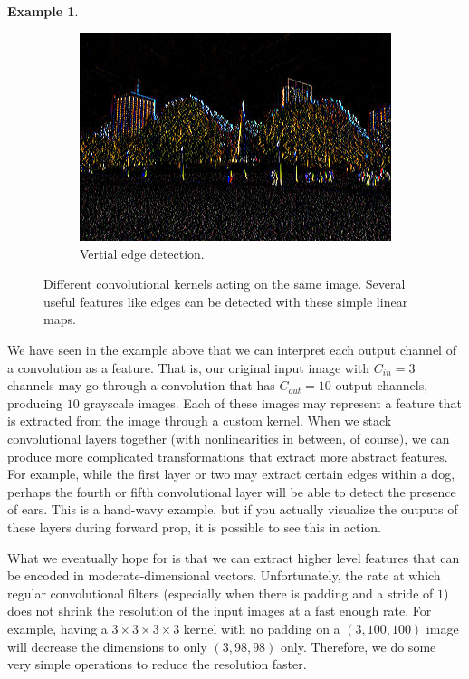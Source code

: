 \documentclass{article}
\theoremstyle{definition}
\newtheorem{example}{Example}[section]
\theoremstyle{remark}
\theoremstyle{definition}
\begin{document}
\begin{example}
\begin{figure}[hbt!]
\begin{subfigure}[b]{0.32\textwidth}
            \includegraphics[width=\textwidth]{Images/OpenCV/Vertical.png}
            \caption{Vertial edge detection. }
            \label{fig:vertical_edge}
        \end{subfigure} 

        \caption{Different convolutional kernels acting on the same image. Several useful features like edges can be detected with these simple linear maps. }
        \label{fig:feature_extraction}
    \end{figure}
    \end{example}

    We have seen in the example above that we can interpret each output channel of a convolution as a feature. That is, our original input image with $C_{in} = 3$ channels may go through a convolution that has $C_{out} = 10$ output channels, producing $10$ grayscale images. Each of these images may represent a feature that is extracted from the image through a custom kernel. When we stack convolutional layers together (with nonlinearities in between, of course), we can produce more complicated transformations that extract more abstract features. For example, while the first layer or two may extract certain edges within a dog, perhaps the fourth or fifth convolutional layer will be able to detect the presence of ears. This is a hand-wavy example, but if you actually visualize the outputs of these layers during forward prop, it is possible to see this in action.  

    What we eventually hope for is that we can extract higher level features that can be encoded in moderate-dimensional vectors. Unfortunately, the rate at which regular convolutional filters (especially when there is padding and a stride of $1$) does not shrink the resolution of the input images at a fast enough rate. For example, having a $3 \times 3 \times 3 \times 3$ kernel with no padding on a $(3, 100, 100)$ image will decrease the dimensions to only $(3, 98, 98)$ only. Therefore, we do some very simple operations to reduce the resolution faster. 
\end{document}
